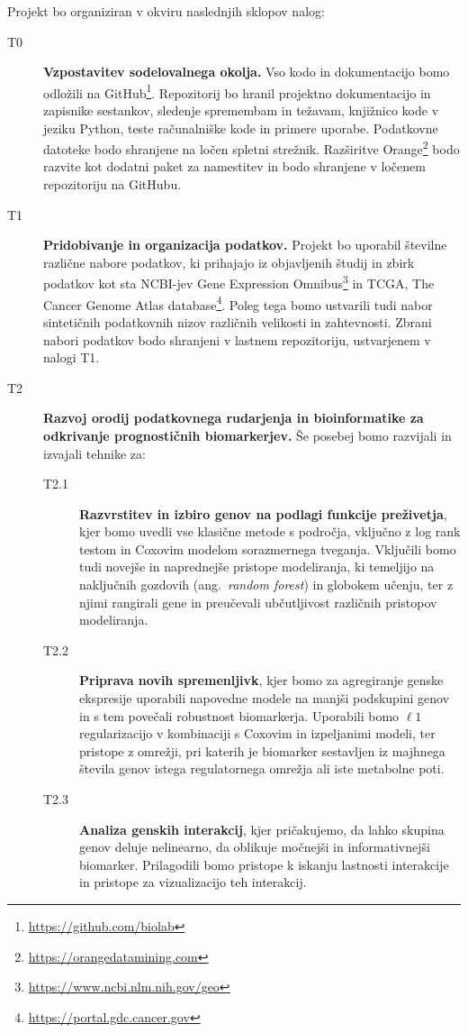 \documentclass[11pt,a4paper]{article}
\newcommand{\myurl}[1]{\footnote{\url{#1}}}
\renewcommand{\bold}{\textbf}
\begin{document}
Projekt bo organiziran v okviru naslednjih sklopov nalog:
\begin{description}
	\item[T0] \bold{Vzpostavitev sodelovalnega okolja.} Vso kodo in dokumentacijo bomo odložili na GitHub\myurl{https://github.com/biolab}. Repozitorij bo hranil projektno dokumentacijo in zapisnike sestankov, sledenje spremembam in težavam, knjižnico kode v jeziku Python, teste računalniške kode in primere uporabe. Podatkovne datoteke bodo shranjene na ločen spletni strežnik. Razširitve Orange\myurl{https://orangedatamining.com} bodo razvite kot dodatni paket za namestitev in bodo shranjene v ločenem repozitoriju na GitHubu.
	\item[T1] \bold{Pridobivanje in organizacija podatkov.} Projekt bo uporabil številne različne nabore podatkov, ki prihajajo iz objavljenih študij in zbirk podatkov kot sta NCBI-jev Gene Expression Omnibus\myurl{https://www.ncbi.nlm.nih.gov/geo} in TCGA, The Cancer Genome Atlas database\myurl{https://portal.gdc.cancer.gov}. Poleg tega bomo ustvarili tudi nabor sintetičnih podatkovnih nizov različnih velikosti in zahtevnosti. Zbrani nabori podatkov bodo shranjeni v lastnem repozitoriju, ustvarjenem v nalogi T1.
	\item[T2] \bold{Razvoj orodij podatkovnega rudarjenja in bioinformatike za odkrivanje prognostičnih biomarkerjev.} Še posebej bomo razvijali in izvajali tehnike za:
	\begin{description}
		\item[T2.1] \bold{Razvrstitev in izbiro genov na podlagi funkcije preživetja}, kjer bomo uvedli vse klasične metode s področja, vključno z log rank testom in Coxovim modelom sorazmernega tveganja. Vključili bomo tudi novejše in naprednejše pristope modeliranja, ki temeljijo na naključnih gozdovih (ang.~{\em random forest}) in globokem učenju, ter z njimi rangirali gene in preučevali ubčutljivost različnih pristopov modeliranja.
		\item[T2.2] \bold{Priprava novih spremenljivk}, kjer bomo za agregiranje genske ekspresije uporabili napovedne modele na manjši podskupini genov in s tem povečali robustnost biomarkerja. Uporabili bomo $\ell 1$ regularizacijo v kombinaciji s Coxovim in izpeljanimi modeli, ter pristope z omrežji, pri katerih je biomarker sestavljen iz majhnega števila genov istega regulatornega omrežja ali iste metabolne poti.
		\item[T2.3] \bold{Analiza genskih interakcij}, kjer pričakujemo, da lahko skupina genov deluje nelinearno, da oblikuje močnejši in informativnejši biomarker. Prilagodili bomo pristope k iskanju lastnosti interakcije in pristope za vizualizacijo teh interakcij.

\end{description}
\end{description}
\end{document}
